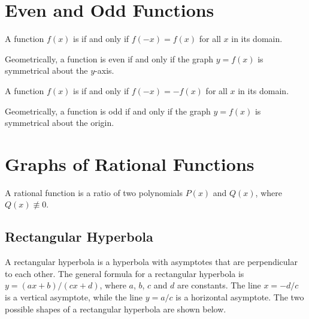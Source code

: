\section{Even and Odd Functions}

\begin{definition}
    A function $f(x)$ is  if and only if $f(-x) = f(x)$ for all $x$ in its domain.
\end{definition}

Geometrically, a function is even if and only if the graph $y = f(x)$ is symmetrical about the $y$-axis.

\begin{definition}
    A function $f(x)$ is  if and only if $f(-x) = -f(x)$ for all $x$ in its domain.
\end{definition}

Geometrically, a function is odd if and only if the graph $y = f(x)$ is symmetrical about the origin.

\section{Graphs of Rational Functions}

A rational function is a ratio of two polynomials $P(x)$ and $Q(x)$, where $Q(x) \not\equiv 0$.

\subsection{Rectangular Hyperbola}

A rectangular hyperbola is a hyperbola with asymptotes that are perpendicular to each other. The general formula for a rectangular hyperbola is $y = (ax + b)/(cx + d)$, where $a$, $b$, $c$ and $d$ are constants. The line $x = -d/c$ is a vertical asymptote, while the line $y = a/c$ is a horizontal asymptote. The two possible shapes of a rectangular hyperbola are shown below.

